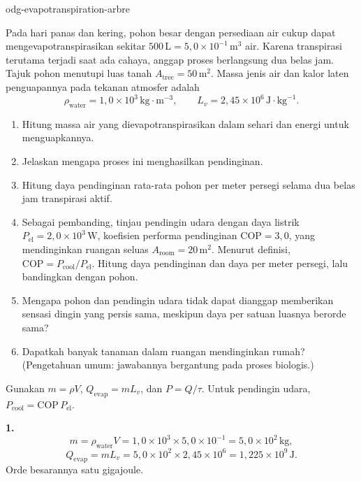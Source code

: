 \begin{exo}{odg-evapotranspiration-arbre}

Pada hari panas dan kering, pohon besar dengan persediaan air cukup dapat mengevapotranspirasikan sekitar $500\,\text{L}=5{,}0\times10^{-1}\,\text{m}^3$ air. Karena transpirasi terutama terjadi saat ada cahaya, anggap proses berlangsung dua belas jam. Tajuk pohon menutupi luas tanah $A_{\text{tree}}=50\,\text{m}^2$. Massa jenis air dan kalor laten penguapannya pada tekanan atmosfer adalah
\[
\rho_{\text{water}}=1{,}0\times10^3\,\text{kg}\!\cdot\!\text{m}^{-3},
\qquad L_v=2{,}45\times10^6\,\text{J}\!\cdot\!\text{kg}^{-1}.
\]
\begin{enumerate}
  \item Hitung massa air yang dievapotranspirasikan dalam sehari dan energi untuk menguapkannya.
  \item Jelaskan mengapa proses ini menghasilkan pendinginan.
  \item Hitung daya pendinginan rata-rata pohon per meter persegi selama dua belas jam transpirasi aktif.
  \item Sebagai pembanding, tinjau pendingin udara dengan daya listrik $P_{\mathrm{el}}=2{,}0\times10^3\,\text{W}$, koefisien performa pendinginan $\mathrm{COP}=3{,}0$, yang mendinginkan ruangan seluas $A_{\text{room}}=20\,\text{m}^2$. Menurut definisi, $\mathrm{COP}=P_{\text{cool}}/P_{\mathrm{el}}$. Hitung daya pendinginan dan daya per meter persegi, lalu bandingkan dengan pohon.
  \item Mengapa pohon dan pendingin udara tidak dapat dianggap memberikan sensasi dingin yang persis sama, meskipun daya per satuan luasnya berorde sama?
  \item Dapatkah banyak tanaman dalam ruangan mendinginkan rumah? (Pengetahuan umum: jawabannya bergantung pada proses biologis.)
\end{enumerate}
\begin{indication}
Gunakan $m=\rho V$, $Q_{\mathrm{evap}}=mL_v$, dan $P=Q/\tau$. Untuk pendingin udara, $P_{\text{cool}}=\mathrm{COP}\,P_{\mathrm{el}}$.
\end{indication}
\begin{solution}
\textbf{1.}
\[
m=\rho_{\text{water}}V=1{,}0\times10^3\times5{,}0\times10^{-1}
=5{,}0\times10^2\,\text{kg},
\]
\[
Q_{\mathrm{evap}}=mL_v=5{,}0\times10^2\times2{,}45\times10^6
=1{,}225\times10^9\,\text{J}.
\]
Orde besarannya satu gigajoule.


\end{solution}
\end{exo}
